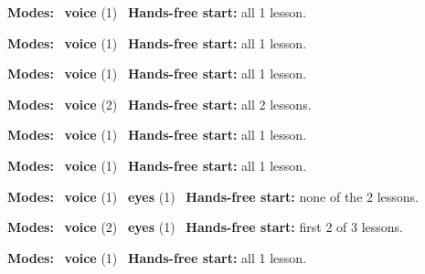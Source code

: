\expandafter\def\csname hlchaptermodality249\endcsname{%
  {\small\noindent
    \textbf{Modes:} \hlvoicesign{}~\textbf{voice} (1)\quad
    \hlvoicesign{}~\textbf{Hands-free start:} all 1 lesson.%
    \par}\medskip
}

\expandafter\def\csname hlchaptermodality250\endcsname{%
  {\small\noindent
    \textbf{Modes:} \hlvoicesign{}~\textbf{voice} (1)\quad
    \hlvoicesign{}~\textbf{Hands-free start:} all 1 lesson.%
    \par}\medskip
}

\expandafter\def\csname hlchaptermodality251\endcsname{%
  {\small\noindent
    \textbf{Modes:} \hlvoicesign{}~\textbf{voice} (1)\quad
    \hlvoicesign{}~\textbf{Hands-free start:} all 1 lesson.%
    \par}\medskip
}

\expandafter\def\csname hlchaptermodality252\endcsname{%
  {\small\noindent
    \textbf{Modes:} \hlvoicesign{}~\textbf{voice} (2)\quad
    \hlvoicesign{}~\textbf{Hands-free start:} all 2 lessons.%
    \par}\medskip
}

\expandafter\def\csname hlchaptermodality253\endcsname{%
  {\small\noindent
    \textbf{Modes:} \hlvoicesign{}~\textbf{voice} (1)\quad
    \hlvoicesign{}~\textbf{Hands-free start:} all 1 lesson.%
    \par}\medskip
}

\expandafter\def\csname hlchaptermodality254\endcsname{%
  {\small\noindent
    \textbf{Modes:} \hlvoicesign{}~\textbf{voice} (1)\quad
    \hlvoicesign{}~\textbf{Hands-free start:} all 1 lesson.%
    \par}\medskip
}

\expandafter\def\csname hlchaptermodality255\endcsname{%
  {\small\noindent
    \textbf{Modes:} \hlvoicesign{}~\textbf{voice} (1) \quad \hlsightsign{}~\textbf{eyes} (1)\quad
    \hlvoicesign{}~\textbf{Hands-free start:} none of the 2 lessons.%
    \par}\medskip
}

\expandafter\def\csname hlchaptermodality256\endcsname{%
  {\small\noindent
    \textbf{Modes:} \hlvoicesign{}~\textbf{voice} (2) \quad \hlsightsign{}~\textbf{eyes} (1)\quad
    \hlvoicesign{}~\textbf{Hands-free start:} first 2 of 3 lessons.%
    \par}\medskip
}

\expandafter\def\csname hlchaptermodality257\endcsname{%
  {\small\noindent
    \textbf{Modes:} \hlvoicesign{}~\textbf{voice} (1)\quad
    \hlvoicesign{}~\textbf{Hands-free start:} all 1 lesson.%
    \par}\medskip
}

